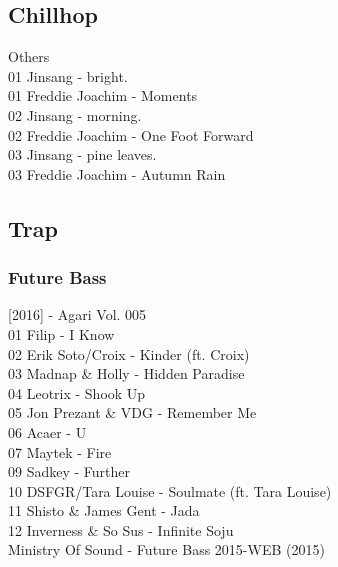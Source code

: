 \begin{multicols}{2}
\subsection*{Chillhop}
 \large Others \normalsize\\
 01 Jinsang - bright.\\ 01 Freddie Joachim - Moments\\ 02 Jinsang - morning.\\ 02 Freddie Joachim - One Foot Forward\\ 03 Jinsang - pine leaves.\\ 03 Freddie Joachim - Autumn Rain\\
\subsection*{Trap}
 \subsubsection*{Future Bass}
 \large [2016] - Agari Vol. 005 \normalsize\\
 01 Filip - I Know\\ 02 Erik Soto/Croix - Kinder (ft. Croix)\\ 03 Madnap \& Holly - Hidden Paradise\\ 04 Leotrix - Shook Up\\ 05 Jon Prezant \& VDG - Remember Me\\ 06 Acaer - U\\ 07 Maytek - Fire\\ 09 Sadkey - Further\\ 10 DSFGR/Tara Louise - Soulmate (ft. Tara Louise)\\ 11 Shisto \& James Gent - Jada\\ 12 Inverness \& So Sus - Infinite Soju\\
 \large Ministry Of Sound - Future Bass 2015-WEB (2015) \normalsize\\

\end{multicols}
